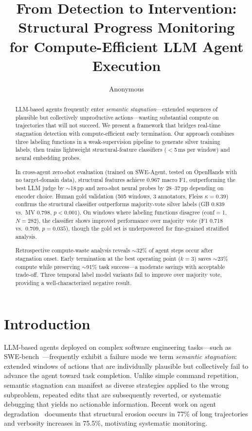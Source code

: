 \documentclass[11pt,a4paper]{article}
\title{From Detection to Intervention: Structural Progress Monitoring\\for Compute-Efficient LLM Agent Execution}
\author{Anonymous}
\date{}
\begin{document}
\maketitle

\begin{abstract}
LLM-based agents frequently enter \emph{semantic stagnation}---extended sequences of plausible but collectively unproductive actions---wasting substantial compute on trajectories that will not succeed.
We present a framework that bridges real-time stagnation detection with compute-efficient early termination.
Our approach combines three labeling functions in a weak-supervision pipeline to generate silver training labels, then trains lightweight structural-feature classifiers ($<$5\,ms per window) and neural embedding probes.

In cross-agent zero-shot evaluation (trained on SWE-Agent, tested on OpenHands with no target-domain data), structural features achieve 0.967 macro F1, outperforming the best LLM judge by ${\sim}$18\,pp and zero-shot neural probes by 28--37\,pp depending on encoder choice.
Human gold validation (505 windows, 3 annotators, Fleiss $\kappa{=}0.39$) confirms the structural classifier outperforms majority-vote silver labels (GB 0.839 vs.\ MV 0.798, $p{<}0.001$).
On windows where labeling functions disagree (conf${=}$1, $N{=}282$), the classifier shows improved performance over majority vote (F1 0.718 vs.\ 0.709, $p{=}0.035$), though the gold set is underpowered for fine-grained stratified analysis.

Retrospective compute-waste analysis reveals ${\sim}$32\% of agent steps occur after stagnation onset.
Early termination at the best operating point ($k{=}3$) saves ${\sim}$23\% compute while preserving ${\sim}$91\% task success---a moderate savings with acceptable trade-off.
Three temporal label model variants fail to improve over majority vote, providing a well-characterized negative result.
\end{abstract}

\section{Introduction}

LLM-based agents deployed on complex software engineering tasks---such as SWE-bench~\cite{jimenez2024swebench}---frequently exhibit a failure mode we term \emph{semantic stagnation}: extended windows of actions that are individually plausible but collectively fail to advance the agent toward task completion.
Unlike simple command repetition, semantic stagnation can manifest as diverse strategies applied to the wrong subproblem, repeated edits that are subsequently reverted, or systematic debugging that yields no actionable information.
Recent work on agent degradation~\cite{slopcodebench2026} documents that structural erosion occurs in 77\% of long trajectories and verbosity increases in 75.5\%, motivating systematic monitoring.
\end{document}
